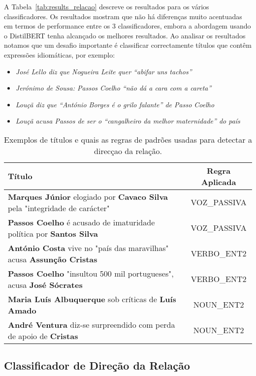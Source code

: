 \documentclass[a4paper, twocolumn, 11pt, twoside]{article}
\begin{document}
A Tabela~\ref{tab:results_relacao} descreve os resultados para os vários classificadores. Os resultados mostram que não há diferenças muito acentuadas em termos de performance entre os 3 classificadores, embora a abordagem usando o DistilBERT tenha alcançado os melhores resultados. Ao analisar os resultados notamos que um desafio importante é classificar correctamente títulos que contêm expressões idiomáticas, por exemplo:

\begin{itemize}
\item{\textit{José Lello diz que Nogueira Leite quer “abifar uns tachos”}}
\item{\textit{Jerónimo de Sousa: Passos Coelho “não dá a cara com a careta”}}
\item{\textit{Louçã diz que “António Borges é o grilo falante” de Passo Coelho}}
\item{\textit{Louçã acusa Passos de ser o “cangalheiro da melhor maternidade” do país}}
\end{itemize}

\begin{table*}
  \centering
  \begin{tabular}{lc}
      {\bf Título} & {\bf Regra Aplicada} \\
      \hline
	  \textbf{Marques Júnior} elogiado por \textbf{Cavaco Silva} pela "integridade de carácter" & VOZ\_PASSIVA \\
	  \textbf{Passos Coelho} é acusado de imaturidade política por \textbf{Santos Silva}  		& VOZ\_PASSIVA \\
	  \textbf{António Costa} vive no "país das maravilhas" acusa \textbf{Assunção Cristas}      & VERBO\_ENT2 \\
	  \textbf{Passos Coelho} "insultou 500 mil portugueses", acusa \textbf{José Sócrates}		& VERBO\_ENT2 \\ 
	  \textbf{Maria Luís Albuquerque} sob críticas de \textbf{Luís Amado}						& NOUN\_ENT2 \\
	  \textbf{André Ventura} diz-se surpreendido com perda de apoio de \textbf{Cristas}			& NOUN\_ENT2 \\

	  \hline
  \end{tabular}
  \caption{Exemplos de títulos e quais as regras de padrões usadas para detectar a direcçao da relação.}
  \label{tab:examples_patterns_direction}
\end{table*}

\subsection{Classificador de Direção da Relação}
\label{subsec:rel_direction}
\end{document}
